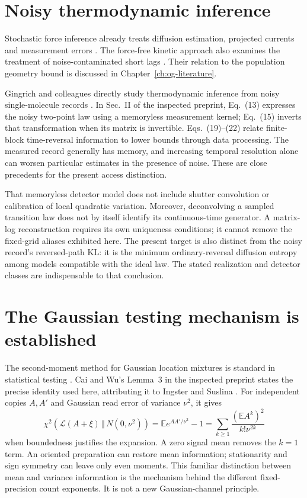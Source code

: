 \section{Noisy thermodynamic inference}
Stochastic force inference already treats diffusion estimation, projected
currents and measurement errors \cite{ogFrishman2020}. The force-free
kinetic approach also examines the treatment of noise-contaminated short
lags \cite{ogDiTerlizzi2025}. Their relation to the population geometry
bound is discussed in Chapter~\ref{ch:og-literature}.

Gingrich and colleagues directly study thermodynamic inference from noisy
single-molecule records \cite{dgGingrich2026}. In Sec.~II of the inspected
preprint, Eq.~(13) expresses the noisy two-point law using a memoryless
measurement kernel; Eq.~(15) inverts that transformation when its matrix
is invertible. Eqs.~(19)--(22) relate finite-block time-reversal information
to lower bounds through data processing. The measured record generally
has memory, and increasing temporal resolution alone can worsen particular
estimates in the presence of noise. These are close precedents for the
present access distinction.

That memoryless detector model does not include shutter convolution or
calibration of local quadratic variation. Moreover, deconvolving a
sampled transition law does not by itself identify its continuous-time
generator. A matrix-log reconstruction requires its own uniqueness
conditions; it cannot remove the fixed-grid aliases exhibited here.
The present target is also distinct from the noisy record's reversed-path
KL: it is the minimum ordinary-reversal diffusion entropy among models
compatible with the ideal law. The stated realization and detector classes
are indispensable to that conclusion.

\section{The Gaussian testing mechanism is established}
The second-moment method for Gaussian location mixtures is standard in
statistical testing \cite{caLeCamYang2000}. Cai and Wu's Lemma~3 in the
inspected preprint states the precise identity used here, attributing it
to Ingster and Suslina \cite{dgCai2020}. For independent copies $A,A'$
and Gaussian read error of variance $\nu^2$, it gives
\[
 \chi^2\!\left(\mathcal L(A+\xi)\,\Vert\,N(0,\nu^2)\right)
 =\mathbb E e^{AA'/\nu^2}-1
 =\sum_{k\geq1}\frac{(\mathbb E A^k)^2}{k!\nu^{2k}}
\]
when boundedness justifies the expansion. A zero signal mean removes the
$k=1$ term. An oriented preparation can restore mean information; stationarity
and sign symmetry can leave only even moments. This familiar distinction
between mean and variance information is the mechanism behind the different
fixed-precision count exponents. It is not a new Gaussian-channel principle.

